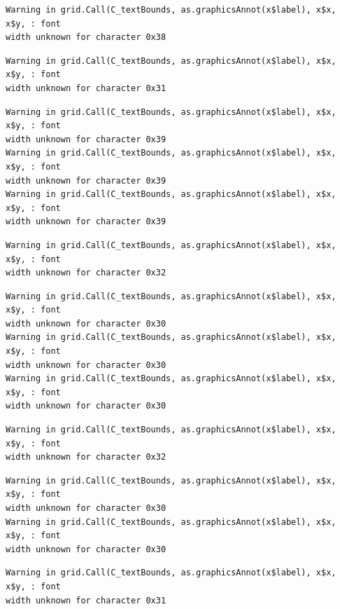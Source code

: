 \documentclass[
  letterpaper,
]{scrbook}
\begin{document}
\begin{verbatim}
Warning in grid.Call(C_textBounds, as.graphicsAnnot(x$label), x$x, x$y, : font
width unknown for character 0x38
\end{verbatim}

\begin{verbatim}
Warning in grid.Call(C_textBounds, as.graphicsAnnot(x$label), x$x, x$y, : font
width unknown for character 0x31
\end{verbatim}

\begin{verbatim}
Warning in grid.Call(C_textBounds, as.graphicsAnnot(x$label), x$x, x$y, : font
width unknown for character 0x39
Warning in grid.Call(C_textBounds, as.graphicsAnnot(x$label), x$x, x$y, : font
width unknown for character 0x39
Warning in grid.Call(C_textBounds, as.graphicsAnnot(x$label), x$x, x$y, : font
width unknown for character 0x39
\end{verbatim}

\begin{verbatim}
Warning in grid.Call(C_textBounds, as.graphicsAnnot(x$label), x$x, x$y, : font
width unknown for character 0x32
\end{verbatim}

\begin{verbatim}
Warning in grid.Call(C_textBounds, as.graphicsAnnot(x$label), x$x, x$y, : font
width unknown for character 0x30
Warning in grid.Call(C_textBounds, as.graphicsAnnot(x$label), x$x, x$y, : font
width unknown for character 0x30
Warning in grid.Call(C_textBounds, as.graphicsAnnot(x$label), x$x, x$y, : font
width unknown for character 0x30
\end{verbatim}

\begin{verbatim}
Warning in grid.Call(C_textBounds, as.graphicsAnnot(x$label), x$x, x$y, : font
width unknown for character 0x32
\end{verbatim}

\begin{verbatim}
Warning in grid.Call(C_textBounds, as.graphicsAnnot(x$label), x$x, x$y, : font
width unknown for character 0x30
Warning in grid.Call(C_textBounds, as.graphicsAnnot(x$label), x$x, x$y, : font
width unknown for character 0x30
\end{verbatim}

\begin{verbatim}
Warning in grid.Call(C_textBounds, as.graphicsAnnot(x$label), x$x, x$y, : font
width unknown for character 0x31
\end{verbatim}
\end{document}
